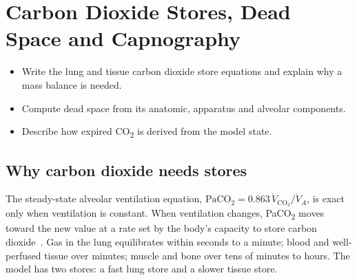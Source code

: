 \chapter{Carbon Dioxide Stores, Dead Space and Capnography}
\label{ch:ch10}

\begin{objectives}
\begin{itemize}[leftmargin=*]
  \item Write the lung and tissue carbon dioxide store equations and explain why a mass balance is needed.
  \item Compute dead space from its anatomic, apparatus and alveolar components.
  \item Describe how expired CO\textsubscript{2} is derived from the model state.
\end{itemize}
\end{objectives}

\section{Why carbon dioxide needs stores}
\label{sec:co2-why}
The steady-state alveolar ventilation equation, $\mathrm{PaCO_2} = 0.863\,\dot V_{\mathrm{CO_2}}/\dot V_A$, is exact only when ventilation is constant. When ventilation changes, PaCO\textsubscript{2} moves toward the new value at a rate set by the body's capacity to store carbon dioxide~\citep{farhi1955}. Gas in the lung equilibrates within seconds to a minute; blood and well-perfused tissue over minutes; muscle and bone over tens of minutes to hours. The model has two stores: a fast lung store and a slower tissue store.


